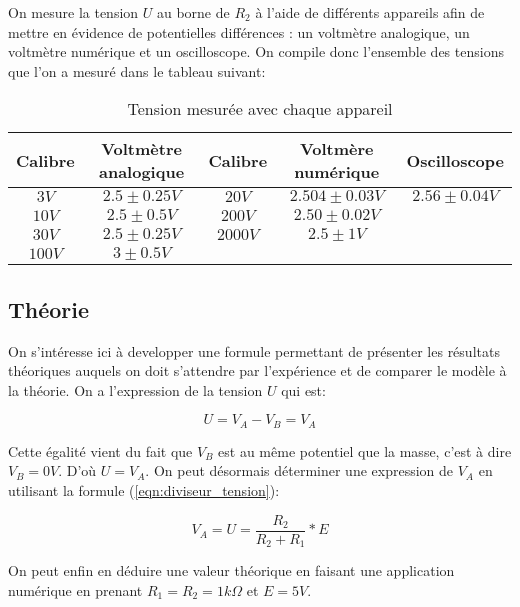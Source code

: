 \documentclass[10pt]{article}
\begin{document}
On mesure la tension $U$ au borne de $R_{2}$ à l'aide de différents appareils afin de mettre en évidence de potentielles différences
: un voltmètre analogique, un voltmètre numérique et un oscilloscope. On compile donc l'ensemble des tensions que l'on a mesuré dans
le tableau suivant:

\begin{table}[h!]
    \begin{center}
        \begin{tabular}{|c|c||c|c||c|}
            \hline
            Calibre & Voltmètre analogique & Calibre & Voltmère numérique & Oscilloscope \\
            \hline
            $3V$ & $2.5 \pm 0.25V$ & $20V$ & $2.504 \pm 0.03V$ & $2.56 \pm 0.04V$ \\
            $10V$ & $2.5 \pm 0.5V$ & $200V$ & $2.50 \pm 0.02V$ &  \\
            $30V$ & $2.5 \pm 0.25V$ & $2000V$ & $2.5 \pm 1V$ &  \\
            $100V$ & $3 \pm 0.5V$ & & & \\
            \hline
        \end{tabular}
        \caption{Tension mesurée avec chaque appareil}
        \label{table:table1}
    \end{center}
\end{table}

\subsection{Théorie}
On s'intéresse ici à developper une formule permettant de présenter les résultats théoriques auquels on doit s'attendre par l'expérience
et de comparer le modèle à la théorie. On a l'expression de la tension $U$ qui est:

\begin{equation}
    U = V_A - V_B = V_A
\end{equation}

Cette égalité vient du fait que $V_B$ est au même potentiel que la masse, c'est à dire $V_B = 0V$. D'où $U = V_A$. On peut
désormais déterminer une expression de $V_A$ en utilisant la formule (\ref{eqn:diviseur_tension}):

\begin{equation}
    V_A = U = \frac{R_2}{R_2 + R_1} * E
\end{equation}

On peut enfin en déduire une valeur théorique en faisant une application numérique en prenant $R_1 = R_2 = 1 k\Omega$ et $E = 5V$.
\end{document}
